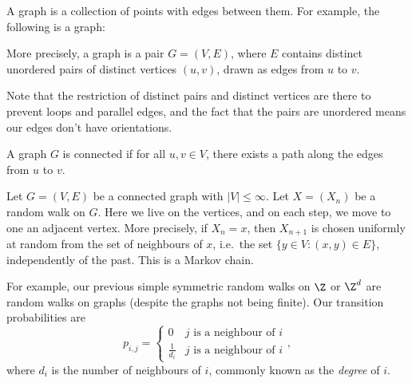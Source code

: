 \documentclass[a4paper]{article}
\begin{document}
\begin{eg}
  A graph is a collection of points with edges between them. For example, the following is a graph:
  \begin{center}
  \end{center}
  More precisely, a graph is a pair $G = (V, E)$, where $E$ contains distinct unordered pairs of distinct vertices $(u, v)$, drawn as edges from $u$ to $v$.

  Note that the restriction of distinct pairs and distinct vertices are there to prevent loops and parallel edges, and the fact that the pairs are unordered means our edges don't have orientations.

  A graph $G$ is connected if for all $u, v \in V$, there exists a path along the edges from $u$ to $v$.

  Let $G = (V, E)$ be a connected graph with $|V| \leq \infty$. Let $X = (X_n)$ be a random walk on $G$. Here we live on the vertices, and on each step, we move to one an adjacent vertex. More precisely, if $X_n = x$, then $X_{n + 1}$ is chosen uniformly at random from the set of neighbours of $x$, i.e.\ the set $\{y \in V: (x, y) \in E\}$, independently of the past. This is a Markov chain.

  For example, our previous simple symmetric random walks on $\Z$ or $\Z^d$ are random walks on graphs (despite the graphs not being finite). Our transition probabilities are
  \[
    p_{i, j} =
    \begin{cases}
      0 & j\text{ is a neighbour of }i\\
      \frac{1}{d_i} & j\text{ is a neighbour of }i
    \end{cases},
  \]
  where $d_i$ is the number of neighbours of $i$, commonly known as the \emph{degree} of $i$.


\end{eg}
\end{document}
